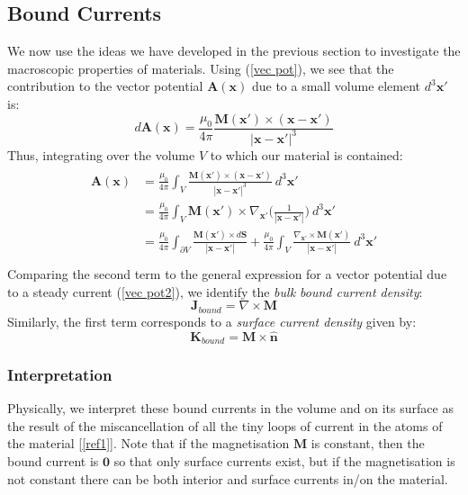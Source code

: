 \documentclass[a4paper]{article}
\numberwithin{equation}{section}
\begin{document}
\subsection{Bound Currents}
We now use the ideas we have developed in the previous section to investigate the macroscopic properties of materials. Using (\ref{vec pot}), we see that the contribution to the vector potential $\mathbf{A}(\mathbf{x})$ due to a small volume element $d^3 \mathbf{x}'$ is:
\begin{equation}
d\mathbf{A}(\mathbf{x}) = \frac{\mu_0}{4 \pi} \frac{\mathbf{M}(\mathbf{x}')\times (\mathbf{x}-\mathbf{x}')}{|\mathbf{x} - \mathbf{x}'|^3}
\end{equation}
Thus, integrating over the volume $V$ to which our material is contained:
\begin{align}
\begin{split}
\mathbf{A}(\mathbf{x}) &= \frac{\mu_0}{4 \pi} \int_V \frac{\mathbf{M}(\mathbf{x}') \times (\mathbf{x}-\mathbf{x}')}{|\mathbf{x} - \mathbf{x}'|^3} \ d^3 \mathbf{x}' \\
&= \frac{\mu_0}{4 \pi} \int_V \mathbf{M}(\mathbf{x}') \times \nabla_{\mathbf{x}'} \bigg( \frac{1}{|\mathbf{x}-\mathbf{x}'|} \bigg) \ d^3 \mathbf{x}' \\
&= \frac{\mu_0}{4 \pi} \int_{\partial V} \frac{\mathbf{M}(\mathbf{x}') \times d\mathbf{S}}{|\mathbf{x} - \mathbf{x}'|} + \frac{\mu_0}{4 \pi} \int_V \frac{\nabla_{\mathbf{x}'} \times \mathbf{M}(\mathbf{x}')}{|\mathbf{x}-\mathbf{x}'|} \ d^3 \mathbf{x}' \\
\end{split}
\end{align}
Comparing the second term to the general expression for a vector potential due to a steady current (\ref{vec pot2}), we identify the \textit{bulk bound current density}:
\begin{equation}
\mathbf{J}_{bound}=\nabla \times \mathbf{M} 
\end{equation}
Similarly, the first term corresponds to a \textit{surface current density} given by:
\begin{equation}
\mathbf{K}_{bound}=\mathbf{M} \times \hat{\mathbf{n}}
\end{equation}
\subsubsection{Interpretation}
Physically, we interpret these bound currents in the volume and on its surface as the result of the miscancellation of all the tiny loops of current in the atoms of the material [\ref{ref1}]. Note that if the magnetisation $\mathbf{M}$ is constant, then the bound current is $\mathbf{0}$ so that only surface currents exist, but if the magnetisation is not constant there can be both interior and surface currents in/on the material.
\end{document}
